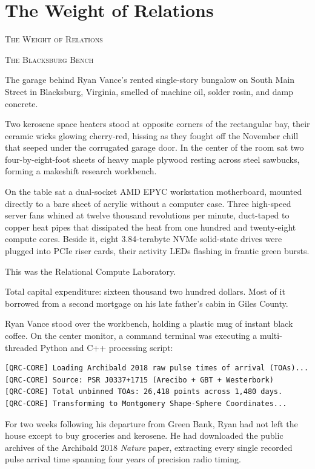 \documentclass[12pt,twoside,openright]{book}
\newcommand{\sceneheader}[1]{%
  \par\vspace{1.8em}%
  {\noindent\centering\scshape\large #1\par}%
  \vspace{1.0em}%
  \noindent%
}
\begin{document}
\chapter{The Weight of Relations}
\sceneheader{The Weight of Relations}

\sceneheader{The Blacksburg Bench}

The garage behind Ryan Vance's rented single-story bungalow on South
Main Street in Blacksburg, Virginia, smelled of machine oil, solder
rosin, and damp concrete.

Two kerosene space heaters stood at opposite corners of the rectangular
bay, their ceramic wicks glowing cherry-red, hissing as they fought off
the November chill that seeped under the corrugated garage door. In the
center of the room sat two four-by-eight-foot sheets of heavy maple
plywood resting across steel sawbucks, forming a makeshift research
workbench.

On the table sat a dual-socket AMD EPYC workstation motherboard, mounted
directly to a bare sheet of acrylic without a computer case. Three
high-speed server fans whined at twelve thousand revolutions per minute,
duct-taped to copper heat pipes that dissipated the heat from one
hundred and twenty-eight compute cores. Beside it, eight 3.84-terabyte
NVMe solid-state drives were plugged into PCIe riser cards, their
activity LEDs flashing in frantic green bursts.

This was the Relational Compute Laboratory.

Total capital expenditure: sixteen thousand two hundred dollars. Most of
it borrowed from a second mortgage on his late father's cabin in Giles
County.

Ryan Vance stood over the workbench, holding a plastic mug of instant
black coffee. On the center monitor, a command terminal was executing a
multi-threaded Python and C++ processing script:

\begin{lstlisting}
[QRC-CORE] Loading Archibald 2018 raw pulse times of arrival (TOAs)...
[QRC-CORE] Source: PSR J0337+1715 (Arecibo + GBT + Westerbork)
[QRC-CORE] Total unbinned TOAs: 26,418 points across 1,480 days.
[QRC-CORE] Transforming to Montgomery Shape-Sphere Coordinates...
\end{lstlisting}

For two weeks following his departure from Green Bank, Ryan had not left
the house except to buy groceries and kerosene. He had downloaded the
public archives of the Archibald 2018 \emph{Nature} paper, extracting
every single recorded pulse arrival time spanning four years of
precision radio timing.
\end{document}
